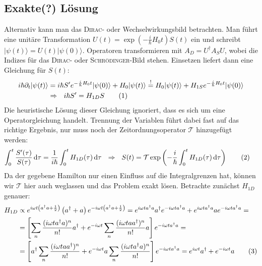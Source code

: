 \documentclass[a4paper,12pt]{article}
\newcommand\numberthis{\addtocounter{equation}{1}\tag{\theequation}}
\newcommand{\intx}{}
\newcommand{\kla}{}
\newcommand{\klam}{}
\newcommand{\Ket}{}
\begin{document}
\subsection{Exakte(?) Lösung}
Alternativ kann man das \textsc{Dirac}- oder Wechselwirkungsbild betrachten. Man führt eine unitäre Transformation $U(t)=\exp\kla\left( {-\frac{i}{\hbar}H_0t} \right)S(t)$ ein und schreibt $\Ket | {\psi(t)} \rangle=U(t)\Ket | {\psi(0)} \rangle$. Operatoren transformieren mit $A_D=U^\dagger A_SU$, wobei die Indizes für das \textsc{Dirac}- oder \textsc{Schrödinger}-Bild stehen. Einsetzen liefert dann eine Gleichung für $S(t)$:
\begin{align*}
i\hbar\partial_t|\psi(t)\rangle &=i\hbar S'e^{-\frac{i}{\hbar}H_0t}\Ket | {\psi(0)} \rangle +H_0\Ket | {\psi(t)} \rangle\overset{!}{=}H_0\Ket | {\psi(t)} \rangle+H_{1S}e^{-\frac{i}{\hbar}H_0t}\Ket | {\psi(0)} \rangle\\
&\Rightarrow\ \ i\hbar S'=H_{1D}S\numberthis\label{Schroedinger fuer S}
\end{align*}
Die heuristische Lösung dieser Gleichung ignoriert, dass es sich um eine Operatorgleichung handelt. Trennung der Variablen führt dabei fast auf das richtige Ergebnis, nur muss noch der Zeitordnungsoperator $\mathcal{T}$ hinzugefügt werden:
\begin{align*}
\intx\int_{0}^{t}\frac{S'(\tau)}{S(\tau)}\,\mathrm{d}\tau&=\frac{1}{i\hbar}\intx\int_{0}^{t}H_{1D}(\tau)\,\mathrm{d}\tau\ \ \Rightarrow\ \ S(t)=\mathcal{T}\exp\kla\left( {-\frac{i}{\hbar}\intx\int_{0}^{t}H_{1D}(\tau)\,\mathrm{d}\tau} \right)\numberthis\label{Neumann-Reihe fuer S}
\end{align*}
Da der gegebene Hamilton nur einen Einfluss auf die Integralgrenzen hat, können wir $\mathcal{T}$ hier auch weglassen und das Problem exakt lösen. Betrachte zunächst $H_{1D}$ genauer:
\begin{align*}
H_{1D}&\propto e^{i\omega t\kla\left( {a^\dagger a+\frac{1}{2}} \right)}\kla\left( {a^\dagger +a} \right)e^{-i\omega t\kla\left( {a^\dagger a+\frac{1}{2}} \right)}=e^{i\omega ta^\dagger a}a^\dagger e^{-i\omega ta^\dagger a}+e^{i\omega ta^\dagger a}a e^{-i\omega ta^\dagger a}=\\
&=\klam\left[ {\sum_n\frac{(i\omega ta^\dagger a)^n}{n!}a^\dagger + e^{-i\omega t}\sum_n\frac{(i\omega taa^\dagger)^n}{n!}a} \right]e^{-i\omega ta^\dagger a}=\\
&=\klam\left[ {a^\dagger\sum_n\frac{(i\omega taa^\dagger )^n}{n!}+e^{-i\omega t}a\sum_n\frac{(i\omega ta^\dagger a)^n}{n!}} \right]e^{-i\omega ta^\dagger a}=e^{i\omega t}a^\dagger +e^{-i\omega t}a\numberthis\label{Kommutatoren fuer H1D}
\end{align*}
\end{document}
